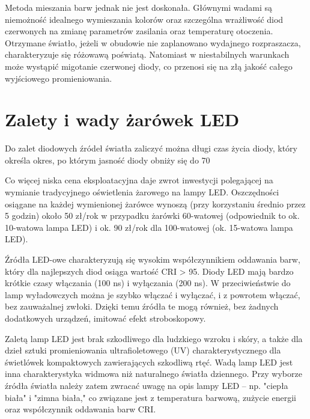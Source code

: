 \documentclass[12pt,a4paper]{book}
\begin{document}
Metoda mieszania barw jednak nie jest doskonała. Głównymi wadami są niemożność idealnego wymieszania kolorów oraz szczególna wrażliwość diod czerwonych na zmianę parametrów zasilania oraz temperaturę otoczenia. Otrzymane światło, jeżeli w obudowie nie zaplanowano wydajnego rozpraszacza, charakteryzuje się różowawą poświatą. Natomiast w niestabilnych warunkach może wystąpić migotanie czerwonej diody, co przenosi się na złą jakość całego wyjściowego promieniowania.

\section*{Zalety i wady żarówek LED}

Do zalet diodowych źródeł światła zaliczyć można długi czas życia diody, który określa okres, po którym jasność diody obniży się do 70%

Co więcej niska cena eksploatacyjna daje zwrot inwestycji polegającej na wymianie tradycyjnego oświetlenia żarowego na lampy LED. Oszczędności osiągane na każdej wymienionej żarówce wynoszą (przy korzystaniu średnio przez 5 godzin) około 50 zł/rok w przypadku żarówki 60-watowej (odpowiednik to ok. 10-watowa lampa LED) i ok. 90 zł/rok dla 100-watowej (ok. 15-watowa lampa LED).

Źródła LED-owe charakteryzują się wysokim współczynnikiem oddawania barw, który dla najlepszych diod osiąga wartość CRI > 95. Diody LED mają bardzo krótkie czasy włączania (100 ns) i wyłączania (200 ns). W przeciwieństwie do lamp wyładowczych można je szybko włączać i wyłączać, i z powrotem włączać, bez zauważalnej zwłoki. Dzięki temu źródła te mogą również, bez żadnych dodatkowych urządzeń, imitować efekt stroboskopowy.

Zaletą lamp LED jest brak szkodliwego dla ludzkiego wzroku i skóry, a także dla dzieł sztuki promieniowania ultrafioletowego (UV) charakterystycznego dla świetlówek kompaktowych zawierających szkodliwą rtęć.
Wadą lamp LED jest inna charakterystyka widmowa niż naturalnego światła dziennego. Przy wyborze źródła światła należy zatem zwracać uwagę na opis lampy LED – np. "ciepła biała" i "zimna biała," co związane jest z temperatura barwową, zużycie energii oraz współczynnik oddawania barw CRI.

\tableofcontents

\listoffigures
\end{document}
